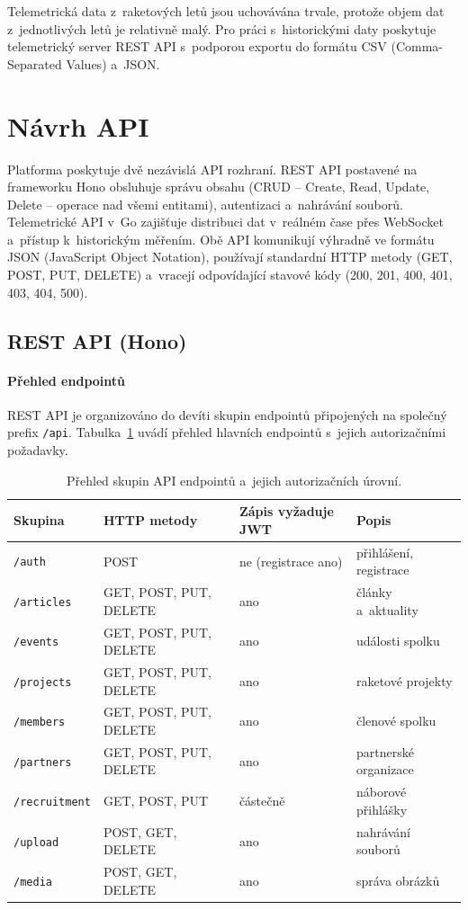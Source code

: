 Telemetrická data z~raketových letů jsou uchovávána trvale, protože objem dat z~jednotlivých letů je relativně malý. Pro práci s~historickými daty poskytuje telemetrický server REST API s~podporou exportu do formátu CSV (Comma-Separated Values) a~JSON.

\section{Návrh API}

Platforma poskytuje dvě nezávislá API rozhraní. REST API postavené na frameworku Hono obsluhuje správu obsahu (CRUD -- Create, Read, Update, Delete -- operace nad všemi entitami), autentizaci a~nahrávání souborů. Telemetrické API v~Go zajišťuje distribuci dat v~reálném čase přes WebSocket a~přístup k~historickým měřením. Obě API komunikují výhradně ve formátu JSON (JavaScript Object Notation), používají standardní HTTP metody (GET, POST, PUT, DELETE) a~vracejí odpovídající stavové kódy (200, 201, 400, 401, 403, 404, 500).

\subsection{REST API (Hono)}

\paragraph{Přehled endpointů}

REST API je organizováno do devíti skupin endpointů připojených na společný prefix \texttt{/api}. Tabulka~\ref{tab:api-endpoints} uvádí přehled hlavních endpointů s~jejich autorizačními požadavky.

\begin{table}[ht]
\centering
\small
\begin{tabular}{llll}
\hline
\textbf{Skupina} & \textbf{HTTP metody} & \textbf{Zápis vyžaduje JWT} & \textbf{Popis} \\
\hline
\texttt{/auth} & POST & ne (registrace ano) & přihlášení, registrace \\
\texttt{/articles} & GET, POST, PUT, DELETE & ano & články a~aktuality \\
\texttt{/events} & GET, POST, PUT, DELETE & ano & události spolku \\
\texttt{/projects} & GET, POST, PUT, DELETE & ano & raketové projekty \\
\texttt{/members} & GET, POST, PUT, DELETE & ano & členové spolku \\
\texttt{/partners} & GET, POST, PUT, DELETE & ano & partnerské organizace \\
\texttt{/recruitment} & GET, POST, PUT & částečně & náborové přihlášky \\
\texttt{/upload} & POST, GET, DELETE & ano & nahrávání souborů \\
\texttt{/media} & POST, GET, DELETE & ano & správa obrázků \\
\hline
\end{tabular}
\caption{Přehled skupin API endpointů a~jejich autorizačních úrovní.}
\label{tab:api-endpoints}
\end{table}

